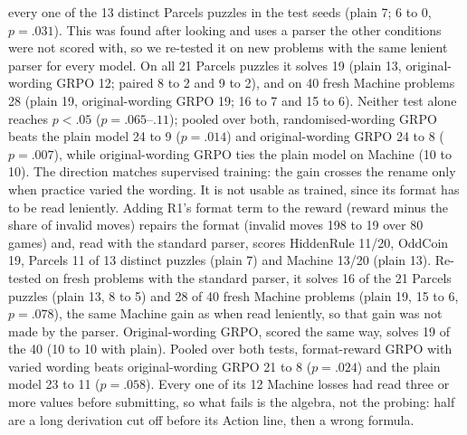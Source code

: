 \documentclass[11pt]{article}
\begin{document}
every one of the 13 distinct Parcels puzzles in the test seeds (plain 7; 6 to 0, $p=.031$). This was found after
looking and uses a parser the other conditions were not scored with, so we re-tested it on new problems with the
same lenient parser for every model. On all 21 Parcels puzzles it solves 19 (plain 13, original-wording GRPO 12;
paired 8 to 2 and 9 to 2), and on 40 fresh Machine problems 28 (plain 19, original-wording GRPO 19; 16 to 7 and 15
to 6). Neither test alone reaches $p<.05$ ($p=.065$--$.11$); pooled over both, randomised-wording GRPO beats the plain
model 24 to 9 ($p=.014$) and original-wording GRPO 24 to 8 ($p=.007$), while original-wording GRPO ties the plain
model on Machine (10 to 10). The direction matches supervised training: the gain crosses the rename only when
practice varied the wording. It is not usable as trained, since its format has to be read leniently. Adding R1's
format term to the reward (reward minus the share of invalid moves) repairs the format (invalid moves 198 to 19 over
80 games) and, read with the standard parser, scores HiddenRule 11/20, OddCoin 19, Parcels 11 of 13 distinct puzzles
(plain 7) and Machine 13/20 (plain 13). Re-tested on fresh problems with the standard parser, it solves 16 of the 21 Parcels puzzles (plain 13, 8 to 5)
and 28 of 40 fresh Machine problems (plain 19, 15 to 6, $p=.078$), the same Machine gain as when read leniently, so
that gain was not made by the parser. Original-wording GRPO, scored the same way, solves 19 of the 40 (10 to 10
with plain). Pooled over both tests, format-reward GRPO with varied wording beats original-wording GRPO 21 to 8
($p=.024$) and the plain model 23 to 11 ($p=.058$). Every one of its 12 Machine losses had read three
or more values before submitting, so what fails is the algebra, not the probing: half are a long derivation cut
off before its Action line, then a wrong formula.
\end{document}
